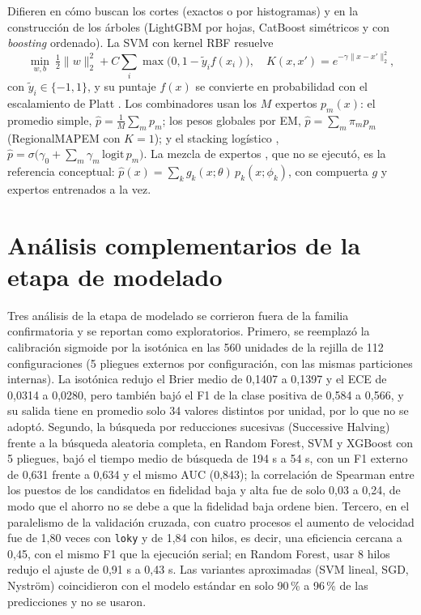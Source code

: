 \documentclass[11pt,a4paper]{article}
\begin{document}
Difieren en cómo buscan los cortes (exactos o por histogramas) y en la construcción de los árboles (LightGBM por hojas, CatBoost simétricos y con \emph{boosting} ordenado). La SVM con kernel RBF \cite{cortes1995} resuelve
\begin{equation}\min_{w,b}\ \tfrac12\|w\|_2^2+C\sum_i\max\big(0,1-\tilde y_if(x_i)\big),\quad K(x,x')=e^{-\gamma\|x-x'\|_2^2},\label{eq:svm}\end{equation}
con $\tilde y_i\in\{-1,1\}$, y su puntaje $f(x)$ se convierte en probabilidad con el escalamiento de Platt \cite{platt1999}. Los combinadores usan los $M$ expertos $p_m(x)$: el promedio simple, $\hat p=\frac1M\sum_mp_m$; los pesos globales por EM, $\hat p=\sum_m\pi_mp_m$ (RegionalMAPEM con $K=1$); y el stacking logístico \cite{wolpert1992}, $\hat p=\sigma\big(\gamma_0+\sum_m\gamma_m\,\mathrm{logit}\,p_m\big)$. La mezcla de expertos \cite{jordan1994}, que no se ejecutó, es la referencia conceptual: $\hat p(x)=\sum_kg_k(x;\theta)\,p_k(x;\phi_k)$, con compuerta $g$ y expertos entrenados a la vez.

\section{Análisis complementarios de la etapa de modelado}\label{app:comp}
Tres análisis de la etapa de modelado se corrieron fuera de la familia confirmatoria y se reportan como exploratorios. Primero, se reemplazó la calibración sigmoide por la isotónica en las 560 unidades de la rejilla de 112 configuraciones (5 pliegues externos por configuración, con las mismas particiones internas). La isotónica redujo el Brier medio de 0,1407 a 0,1397 y el ECE de 0,0314 a 0,0280, pero también bajó el F1 de la clase positiva de 0,584 a 0,566, y su salida tiene en promedio solo 34 valores distintos por unidad, por lo que no se adoptó. Segundo, la búsqueda por reducciones sucesivas (Successive Halving) frente a la búsqueda aleatoria completa, en Random Forest, SVM y XGBoost con 5 pliegues, bajó el tiempo medio de búsqueda de 194 s a 54 s, con un F1 externo de 0,631 frente a 0,634 y el mismo AUC (0,843); la correlación de Spearman entre los puestos de los candidatos en fidelidad baja y alta fue de solo 0,03 a 0,24, de modo que el ahorro no se debe a que la fidelidad baja ordene bien. Tercero, en el paralelismo de la validación cruzada, con cuatro procesos el aumento de velocidad fue de 1,80 veces con \texttt{loky} y de 1,84 con hilos, es decir, una eficiencia cercana a 0,45, con el mismo F1 que la ejecución serial; en Random Forest, usar 8 hilos redujo el ajuste de 0,91 s a 0,43 s. Las variantes aproximadas (SVM lineal, SGD, Nyström) coincidieron con el modelo estándar en solo 90\,\% a 96\,\% de las predicciones y no se usaron.
\end{document}

